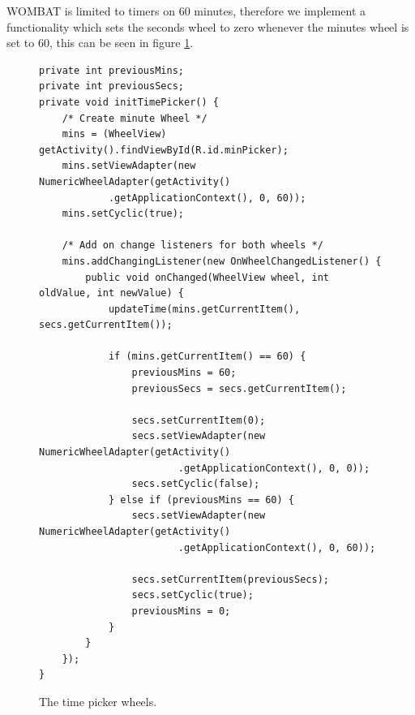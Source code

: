 WOMBAT is limited to timers on 60 minutes, therefore we implement a functionality which sets the seconds wheel to zero whenever the minutes wheel is set to 60, this can be seen in figure \ref{code:customize:time_picker_wheels}.

\begin{figure}[H]
\begin{lstlisting}
private int previousMins;
private int previousSecs;
private void initTimePicker() {
	/* Create minute Wheel */
	mins = (WheelView) getActivity().findViewById(R.id.minPicker);
	mins.setViewAdapter(new NumericWheelAdapter(getActivity()
			.getApplicationContext(), 0, 60));
	mins.setCyclic(true);

	/* Add on change listeners for both wheels */
	mins.addChangingListener(new OnWheelChangedListener() {
		public void onChanged(WheelView wheel, int oldValue, int newValue) {
			updateTime(mins.getCurrentItem(), secs.getCurrentItem());

			if (mins.getCurrentItem() == 60) {
				previousMins = 60;
				previousSecs = secs.getCurrentItem();

				secs.setCurrentItem(0);
				secs.setViewAdapter(new NumericWheelAdapter(getActivity()
						.getApplicationContext(), 0, 0));
				secs.setCyclic(false);
			} else if (previousMins == 60) {
				secs.setViewAdapter(new NumericWheelAdapter(getActivity()
						.getApplicationContext(), 0, 60));

				secs.setCurrentItem(previousSecs);
				secs.setCyclic(true);
				previousMins = 0;
			}
		}
	});
}
\end{lstlisting}
\caption{The time picker wheels.}%
\label{code:customize:time_picker_wheels}%
\end{figure}


